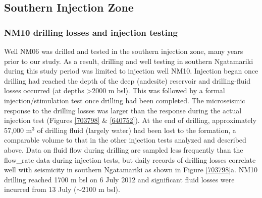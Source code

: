 \subsection{Southern Injection Zone}
\subsubsection{NM10 drilling losses and injection testing}
Well NM06 was drilled and tested in the southern injection zone, many years prior to our study. As a result, drilling and well testing in southern Ngatamariki during this study period was limited to injection well NM10. Injection began once drilling had reached the depth of the deep (andesite) reservoir and drilling-fluid losses occurred (at depths \textgreater2000 m bsl). This was followed by a formal injection\slash{stimulation} test once drilling had been completed. The microseismic response to the drilling losses was larger than the response during the actual injection test (Figures \ref{703798} \& \ref{640752}). At the end of drilling, approximately 57,000 m$^{3}$ of drilling fluid (largely water) had been lost to the formation, a comparable volume to that in the other injection tests analyzed and described above. Data on fluid flow during drilling are sampled less frequently than the \gls{flow_rate} data during injection tests, but daily records of drilling losses correlate well with seismicity in southern Ngatamariki as shown in Figure \ref{703798}a. NM10 drilling reached 1700 m bsl on 6 July 2012 and significant fluid losses were incurred from 13 July ($\sim$2100 m bsl).

